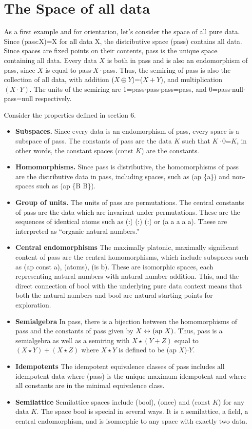 \documentclass[11pt]{article}
\begin{document}
\section{The Space of all data} 

     As a first example and for orientation, let's consider the space of all pure data.  Since (pass:X)=X for all data X, the distributive space (pass) 
contains all data.  Since spaces are fixed points on their contents, pass is the unique space containing all data.  Every data $X$ is both in pass
and is also an endomorphism of pass, since $X$ is equal to pass$\cdot X\cdot$pass.  Thus, the semiring of pass is also the collection of all data, with 
addition ($X\oplus Y$)=($X+Y$), and multiplication $(X\cdot Y)$.  The units of the semiring are $1$=pass$\cdot$pass$\cdot$pass=pass, 
and $0$=pass$\cdot$null$\cdot$pass=null respectively.   

Consider the properties defined in section 6.  
\begin{itemize}
\item{{\bf Subspaces.}  Since every data is an endomorphism of pass, every space is a subspace of pass.  The constants of pass are the data $K$ such that 
$K\cdot 0$=$K$, in other words, the constant spaces (const $K$) are the constants.}
\item{{\bf Homomorphisms.} Since pass is distributive, the homomorphisms of pass are the distributive data in pass, including spaces, such as (ap \{a\}) 
and non-spaces such as (ap \{B B\}).} 
\item{{\bf Group of units.} The units of pass are permutations.  The central constants of pass are the data which 
are invariant under permutations.  These are the sequences of identical atoms such as (:) (:) (:) or (a a a a a).  These are interpreted as ``organic natural numbers.''}
\item{{\bf Central endomorphisms} The maximally platonic, maximally significant content of pass are the central homomorphisms, which include 
subspaces such as (ap const a), (atoms), (is b).  These are isomorphic spaces, each representing natural numbers with natural number 
addition.  This, and the direct connection of bool with the underlying pure data context means that 
both the natural numbers and bool are natural starting points for exploration.} 
\item{{\bf Semialgebra} In pass, there is a bijection between the homomorphisms of pass and the constants of pass given by $X\leftrightarrow ({\rm ap}\ X)$.  Thus,
pass is a semialgebra as well as a semiring with $X\star (Y+Z)$ equal to $(X\star Y)+(X\star Z)$ where $X\star Y$ is defined to be (ap $X$)$\cdot Y$.}
\item{{\bf Idempotents} The idempotent equivalence classes of pass includes all idempotent data where (pass) is the unique maximum idempotent and where all constants are in the minimal equivalence class.}
\item{{\bf Semilattice} Semilattice spaces include (bool), (once) and (const $K$) for any data $K$.  The space bool is special in several ways.  
It is a semilattice, a field, a central endomorphism, and is isomorphic to any space with exactly two data.}
\end{itemize}
\end{document}
